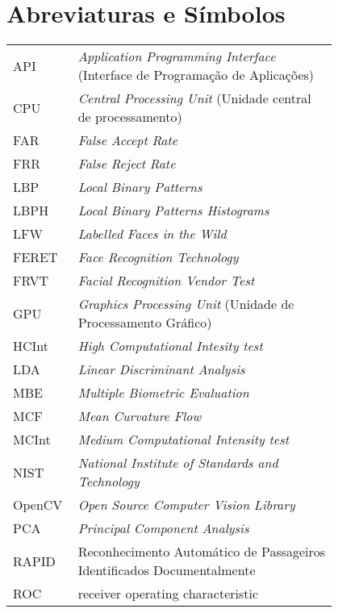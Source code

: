 \chapter*{Abreviaturas e Símbolos}

\begin{flushleft}
\begin{tabular}{l p{0.8\linewidth}}
API		& \textit{Application Programming Interface} (Interface de Programação de Aplicações) \\
CPU		& \textit{Central Processing Unit} (Unidade central de processamento)\\
FAR     & \textit{False Accept Rate} \\
FRR		& \textit{False Reject Rate} \\
LBP 	& \textit{Local Binary Patterns}\\
LBPH	& \textit{Local Binary Patterns Histograms}\\
LFW		& \textit{Labelled Faces in the Wild}\\
FERET   & \textit{Face Recognition Technology}\\
FRVT    & \textit{Facial Recognition Vendor Test}\\
GPU		& \textit{Graphics Processing Unit} (Unidade de Processamento Gráfico)\\
HCInt	& \textit{High Computational Intesity test}\\
LDA		& \textit{Linear Discriminant Analysis}\\
MBE		& \textit{Multiple Biometric Evaluation}\\
MCF		& \textit{Mean Curvature Flow}\\
MCInt	& \textit{Medium Computational Intensity test}\\
NIST	& \textit{National Institute of Standards and Technology} \\
OpenCV	& \textit{Open Source Computer Vision Library} \\
PCA		& \textit{Principal Component Analysis}\\
RAPID	& Reconhecimento Automático de Passageiros Identificados Documentalmente \\
ROC		& receiver operating characteristic\\
\end{tabular}
\end{flushleft}

